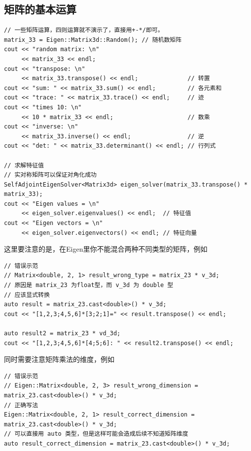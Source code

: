 \subsection{矩阵的基本运算}
\begin{lstlisting}[style=C++]
// 一些矩阵运算，四则运算就不演示了，直接用+-*/即可。
matrix_33 = Eigen::Matrix3d::Random(); // 随机数矩阵
cout << "random matrix: \n"
     << matrix_33 << endl;
cout << "transpose: \n"
     << matrix_33.transpose() << endl;              // 转置
cout << "sum: " << matrix_33.sum() << endl;         // 各元素和
cout << "trace: " << matrix_33.trace() << endl;     // 迹
cout << "times 10: \n"
     << 10 * matrix_33 << endl;                     // 数乘
cout << "inverse: \n"
     << matrix_33.inverse() << endl;                // 逆
cout << "det: " << matrix_33.determinant() << endl; // 行列式

// 求解特征值
// 实对称矩阵可以保证对角化成功
SelfAdjointEigenSolver<Matrix3d> eigen_solver(matrix_33.transpose() * matrix_33);
cout << "Eigen values = \n"
     << eigen_solver.eigenvalues() << endl;  // 特征值
cout << "Eigen vectors = \n"
     << eigen_solver.eigenvectors() << endl; // 特征向量
\end{lstlisting}
这里要注意的是，在Eigen里你不能混合两种不同类型的矩阵，例如
\begin{lstlisting}[style=C++]
// 错误示范
// Matrix<double, 2, 1> result_wrong_type = matrix_23 * v_3d;
// 原因是 matrix_23 为float型，而 v_3d 为 double 型
// 应该显式转换
auto result = matrix_23.cast<double>() * v_3d;
cout << "[1,2,3;4,5,6]*[3;2;1]=" << result.transpose() << endl;

auto result2 = matrix_23 * vd_3d;
cout << "[1,2,3;4,5,6]*[4;5;6]: " << result2.transpose() << endl;
\end{lstlisting}
同时需要注意矩阵乘法的维度，例如
\begin{lstlisting}[style=C++]
// 错误示范
// Eigen::Matrix<double, 2, 3> result_wrong_dimension = matrix_23.cast<double>() * v_3d;
// 正确写法
Eigen::Matrix<double, 2, 1> result_correct_dimension = matrix_23.cast<double>() * v_3d;
// 可以直接用 auto 类型，但是这样可能会造成后续不知道矩阵维度
auto result_correct_dimension = matrix_23.cast<double>() * v_3d;
\end{lstlisting}

